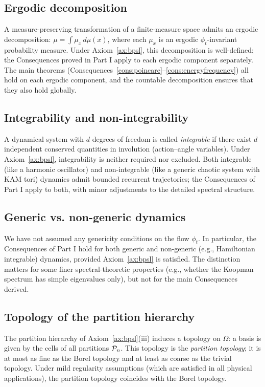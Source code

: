 \subsection{Ergodic decomposition}

A measure-preserving transformation of a finite-measure space admits an ergodic decomposition: $\mu=\int\mu_{x}\,d\mu(x)$, where each $\mu_{x}$ is an ergodic $\phi_{t}$-invariant probability measure. Under Axiom~\ref{ax:bpsl}, this decomposition is well-defined; the Consequences proved in Part I apply to each ergodic component separately. The main theorems (Consequences~\ref{cons:poincare}--\ref{cons:energyfrequency}) all hold on each ergodic component, and the countable decomposition ensures that they also hold globally.

\subsection{Integrability and non-integrability}

A dynamical system with $d$ degrees of freedom is called \emph{integrable} if there exist $d$ independent conserved quantities in involution (action--angle variables). Under Axiom~\ref{ax:bpsl}, integrability is neither required nor excluded. Both integrable (like a harmonic oscillator) and non-integrable (like a generic chaotic system with KAM tori) dynamics admit bounded recurrent trajectories; the Consequences of Part I apply to both, with minor adjustments to the detailed spectral structure.

\subsection{Generic vs. non-generic dynamics}

We have not assumed any genericity conditions on the flow $\phi_{t}$. In particular, the Consequences of Part I hold for both generic and non-generic (e.g., Hamiltonian integrable) dynamics, provided Axiom~\ref{ax:bpsl} is satisfied. The distinction matters for some finer spectral-theoretic properties (e.g., whether the Koopman spectrum has simple eigenvalues only), but not for the main Consequences derived.

\subsection{Topology of the partition hierarchy}

The partition hierarchy of Axiom~\ref{ax:bpsl}(iii) induces a topology on $\Omega$: a basis is given by the cells of all partitions $\mathcal{P}_{n}$. This topology is the \emph{partition topology}; it is at most as fine as the Borel topology and at least as coarse as the trivial topology. Under mild regularity assumptions (which are satisfied in all physical applications), the partition topology coincides with the Borel topology.

\clearpage
